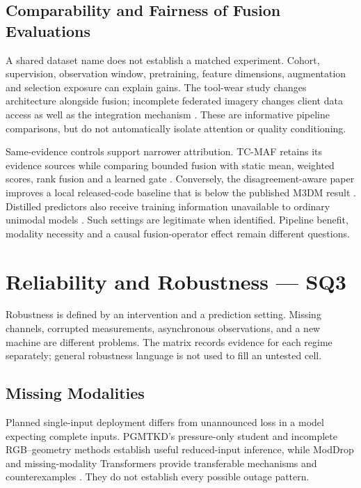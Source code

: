 \subsection{Comparability and Fairness of Fusion Evaluations}
A shared dataset name does not establish a matched experiment. Cohort, supervision, observation window, pretraining, feature dimensions, augmentation and selection exposure can explain gains. The tool-wear study changes architecture alongside fusion; incomplete federated imagery changes client data access as well as the integration mechanism \citep{P045,P051}. These are informative pipeline comparisons, but do not automatically isolate attention or quality conditioning.

Same-evidence controls support narrower attribution. TC-MAF retains its evidence sources while comparing bounded fusion with static mean, weighted scores, rank fusion and a learned gate \citep[PDF p.~7, Table~3]{P026}. Conversely, the disagreement-aware paper improves a local released-code baseline that is below the published M3DM result \citep[PDF p.~10, Table~4]{P033}. Distilled predictors also receive training information unavailable to ordinary unimodal models \citep{Li2025PGMTKD}. Such settings are legitimate when identified. Pipeline benefit, modality necessity and a causal fusion-operator effect remain different questions.

\section{Reliability and Robustness --- SQ3}

Robustness is defined by an intervention and a prediction setting. Missing channels, corrupted measurements, asynchronous observations, and a new machine are different problems. The matrix records evidence for each regime separately; general robustness language is not used to fill an untested cell.

\subsection{Missing Modalities}
Planned single-input deployment differs from unannounced loss in a model expecting complete inputs. PGMTKD's pressure-only student and incomplete RGB--geometry methods establish useful reduced-input inference, while ModDrop and missing-modality Transformers provide transferable mechanisms and counterexamples \citep{Li2025PGMTKD,Sui2026Incomplete,P005,P016}. They do not establish every possible outage pattern.

